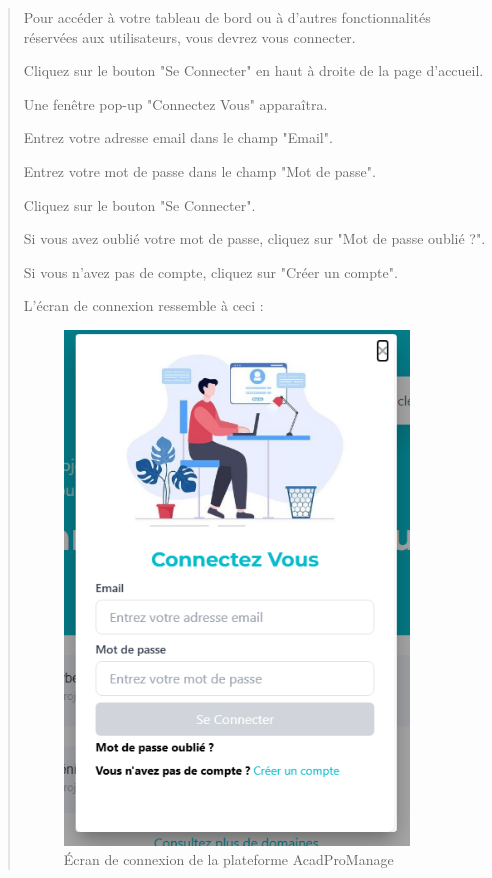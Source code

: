 \documentclass[a4paper,12pt]{article}
\begin{document}
\begin{quote}
Pour accéder à votre tableau de bord ou à d'autres fonctionnalités réservées aux utilisateurs, vous devrez vous connecter.

Cliquez sur le bouton "Se Connecter" en haut à droite de la page d'accueil.

Une fenêtre pop-up "Connectez Vous" apparaîtra.

Entrez votre adresse email dans le champ "Email".

Entrez votre mot de passe dans le champ "Mot de passe".

Cliquez sur le bouton "Se Connecter".

Si vous avez oublié votre mot de passe, cliquez sur "Mot de passe oublié ?".

Si vous n'avez pas de compte, cliquez sur "Créer un compte".

L'écran de connexion ressemble à ceci :

\begin{figure}[H]
\centering
\includegraphics[width=0.9\textwidth]{IMAGES/Connexion.png}
\caption{Écran de connexion de la plateforme AcadProManage}
\label{fig:ecranconnexion}
\end{figure}



\end{quote}
\end{document}
